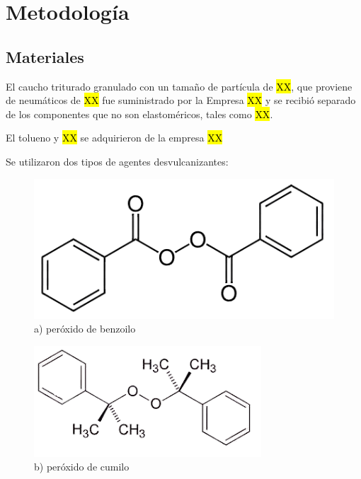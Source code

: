 \chapter{Metodología}
\justifying


\begin{multicols}{2}

\section{Materiales}

El caucho triturado granulado con un tamaño de partícula de \hl{XX}, que proviene de neumáticos de \hl{XX} fue suministrado por la Empresa \hl{XX} y se recibió separado de los componentes que no son elastoméricos, tales como \hl{XX}.

El tolueno y \hl{XX} se adquirieron de la empresa \hl{XX}

Se utilizaron dos tipos de agentes desvulcanizantes:

\begin{figure}[H]
    \centering
    \includegraphics[scale=0.3]{00Figuras/POB-removebg-preview.png}
    \caption{a) peróxido de benzoilo}
    \label{POB}
\end{figure}

\begin{figure}[H]
    \centering
\includegraphics[scale=0.4]{00Figuras/PUC.png}
    \caption{b) peróxido de cumilo}
    \label{PUC}
\end{figure}



\end{multicols}
